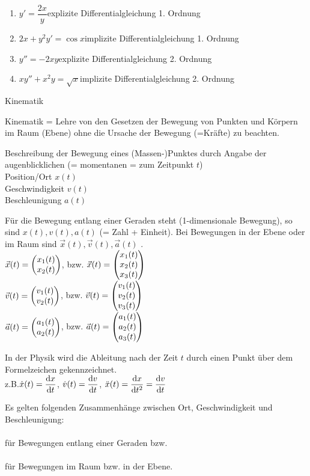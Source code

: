 \Bsp\quad
\begin{enumerate}
	\item $y'=\dfrac{2x}{y}$\qquad explizite Differentialgleichung 1. Ordnung
	\item $2x+y^2y'=\cos x$\qquad implizite Differentialgleichung 1. Ordnung
	\item $y''=-2xy$\qquad explizite Differentialgleichung 2. Ordnung
	\item $xy''+x^2y=\sqrt{x}$\qquad implizite Differentialgleichung 2. Ordnung
\end{enumerate}

\Bsp Kinematik

Kinematik = Lehre von den Gesetzen der Bewegung von Punkten und Körpern im Raum (Ebene) ohne die Ursache der Bewegung (=Kräfte) zu beachten.

Beschreibung der Bewegung eines (Massen-)Punktes durch Angabe der augenblicklichen (= momentanen = zum Zeitpunkt $t$)\\
\hhspace{2cm}Position/Ort $x(t)$\\
\hhspace{2cm}Geschwindigkeit $v(t)$\\
\hhspace{2cm}Beschleunigung $a(t)$

Für die Bewegung entlang einer Geraden steht (1-dimensionale Bewegung), so sind $x(t),v(t),a(t)$  (= Zahl + Einheit). Bei Bewegungen in der Ebene oder im Raum sind $\vec{x}(t),\vec{v}(t),\vec{a}(t)$ .\\
\hhspace{2cm}$\vec{x}(t)=\begin{pmatrix}x_1(t)\\x_2(t)\end{pmatrix}$, bzw. $\vec{x}(t)=\begin{pmatrix}x_1(t)\\x_2(t)\\x_3(t)\end{pmatrix}$\vspace{1ex}\\
\hhspace{2cm}$\vec{v}(t)=\begin{pmatrix}v_1(t)\\v_2(t)\end{pmatrix}$, bzw. $\vec{v}(t)=\begin{pmatrix}v_1(t)\\v_2(t)\\v_3(t)\end{pmatrix}$\vspace{1ex}\\
\hhspace{2cm}$\vec{a}(t)=\begin{pmatrix}a_1(t)\\a_2(t)\end{pmatrix}$, bzw. $\vec{a}(t)=\begin{pmatrix}a_1(t)\\a_2(t)\\a_3(t)\end{pmatrix}$

\imgplaceholder %
\imgplaceholder %

In der Physik wird die Ableitung nach der Zeit $t$ durch einen Punkt über dem Formelzeichen gekennzeichnet.\\
\hhspace{2cm}z.B.\qquad $\dot{x}(t)=\dfrac{\mathrm{d}x}{\mathrm{d}t}$, $\dot{v}(t)=\dfrac{\mathrm{d}v}{\mathrm{d}t}$, $\ddot{x}(t)=\dfrac{\mathrm{d}x}{\mathrm{d}t^2}=\dfrac{\mathrm{d}v}{\mathrm{d}t}$

Es gelten folgenden Zusammenhänge zwischen Ort, Geschwindigkeit und Beschleunigung:\\
\hhspace{2cm}\\
für Bewegungen entlang einer Geraden bzw.\\
\hhspace{2cm}\\
für Bewegungen im Raum bzw. in der Ebene.

